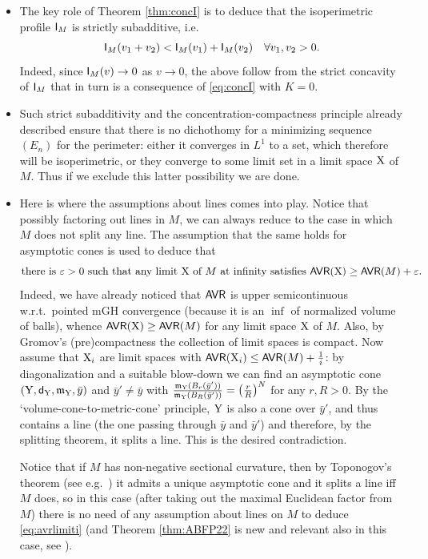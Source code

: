 \documentclass[11pt]{article}
\numberwithin{equation}{section}
\newcommand{\X}{{\rm X}}
\newcommand{\Y}{{\rm Y}}
\newcommand{\sfd}{{\sf d}}
\newcommand{\mm}{{\mathfrak m}}
\newcommand{\eps}{\varepsilon}
\newcommand{\AVR}{{\sf AVR}}
\begin{document}
\begin{itemize}
\item The key role of Theorem \ref{thm:concI}  is to deduce that the isoperimetric profile ${\sf I}_M$ is strictly subadditive, i.e.\ 
 \begin{equation}
\label{eq:Isubadd}
{\sf I}_M(v_1+v_2)<{\sf I}_M(v_1)+{\sf I}_M(v_2)\quad\forall v_1,v_2>0.
\end{equation}
Indeed,  since ${\sf I}_M(v)\to 0$ as $v\to 0$, the above  follow from the strict concavity of  ${\sf I}_M$ that in turn is a consequence of \eqref{eq:concI} with $K=0$.
\item Such strict subadditivity and the concentration-compactness principle already described ensure that there is no dichothomy for a minimizing sequence $(E_n)$ for the perimeter: either it converges in $L^1$ to a set, which therefore will be isoperimetric, or they converge to some limit set in a limit space $\X$ of $M$. Thus if we exclude this latter possibility we are done.
\item Here is where the assumptions about lines comes into play. Notice that possibly  factoring out lines in $M$, we can always reduce to the case in which $M$ does not split any line. The assumption that the same holds for asymptotic cones is used to deduce that 
\begin{equation}
\label{eq:avrlimiti}
\text{there is $\eps>0$ such that any limit $\X$ of $M$ at infinity satisfies $\AVR(\X)\geq\AVR(M)+\eps$.}
\end{equation}
Indeed, we have already noticed that $\AVR$ is upper semicontinuous w.r.t.\ pointed mGH convergence (because it is an $\inf$ of normalized volume of balls), whence   $\AVR(\X)\geq\AVR(M)$ for any limit space $\X$ of $M$. Also,  by Gromov's (pre)compactness the collection of limit spaces is compact. Now assume that $\X_i$  are limit spaces with $\AVR(\X_i)\leq\AVR(M)+\tfrac1i$: by diagonalization and a suitable blow-down we can find  an asymptotic cone $(\Y,\sfd_\Y,\mm_\Y,\bar y)$ and $\bar y'\neq\bar y$ with $\frac{\mm_\Y(B_r(\bar y'))}{\mm_\Y(B_R(\bar y'))}=\big(\tfrac rR\big)^N$ for any $r,R>0$. By the `volume-cone-to-metric-cone' principle, $\Y$ is also a cone over $\bar y'$, and thus contains a line (the one passing through $\bar y$ and $\bar y'$) and therefore, by the splitting theorem, it splits a line. This is the desired contradiction.
 
 Notice that if $M$ has non-negative sectional curvature, then by Toponogov's theorem (see e.g.\ \cite[Theorem 12.2.2]{Petersen16}) it admits a unique asymptotic cone and it splits a line iff $M$ does, so in this case (after taking out the maximal Euclidean factor from $M$) there is no need of  any assumption about lines on $M$ to deduce \eqref{eq:avrlimiti}  (and Theorem  \ref{thm:ABFP22} is new and relevant also in this case, see \cite[Corollary 1.3]{ABFP22}).



\end{itemize}
\end{document}

